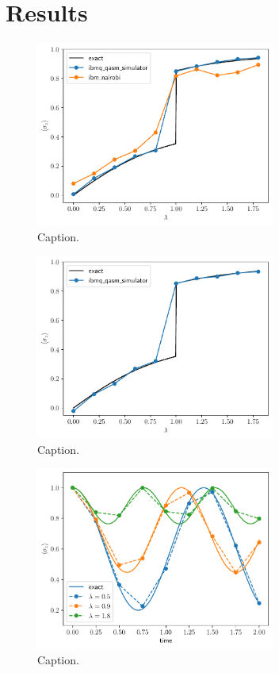 \documentclass[12pt]{article}
\begin{document}
  \section{Results}
    \blindtext

    \begin{figure}
      \centering
      \includegraphics[width=0.7\textwidth]{images/ground-state-magnetization}
      \caption{Caption.%
              \label{fig:ground-state-magnetization}}
    \end{figure}

    \begin{figure}
      \centering
      \includegraphics[width=0.7\textwidth]{images/ground-state-magnetization-test}
      \caption{Caption.%
              \label{fig:ground-state-magnetization-test}}
    \end{figure}

    \begin{figure}
      \centering
      \includegraphics[width=0.7\textwidth]{images/time-evolution-magnetization-test}
      \caption{Caption.%
              \label{fig:time-evolution-magnetization-test}}
    \end{figure}
\end{document}
